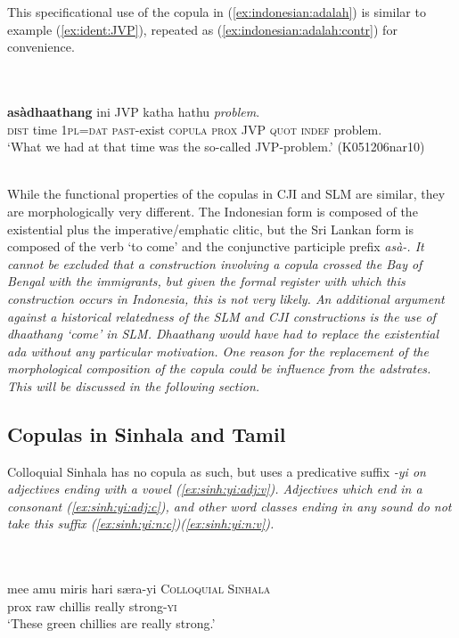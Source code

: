 \documentclass[a4paper,12pt]{article}
\newcommand{\xbox}[2]{\noindent\parbox[t]{#1}{#2}\noindent}
\newcommand{\xref}[1]{(\ref{#1})}
\newcommand{\trs}[2]{{\em #1\em} `#2'}
\newcommand{\ea}{\\\\}
\newcommand{\z}{\\\\}
\begin{document}
This specificational use of the copula in \xref{ex:indonesian:adalah} is similar to example \xref{ex:ident:JVP}, repeated as \xref{ex:indonesian:adalah:contr} for convenience.


\xbox{\textwidth}{
\ea \label{ex:indonesian:adalah:contr}
\gll [Itthu    vakthu kithang=nang nya-aada]     \textbf{asàdhaathang} ini      JVP katha hathu  {\em problem}. \\
     \textsc{dist} time \textsc{1pl}=\textsc{dat} \textsc{past}-exist \textsc{copula} \textsc{prox} JVP \textsc{quot} \textsc{indef} problem. \\
    `What we had at that time was the so-called JVP-problem.' (K051206nar10)
\z
}


While the functional properties of the copulas in CJI and SLM are similar, they are morphologically very different. The Indonesian form is composed of the existential plus the imperative/emphatic clitic, but the Sri Lankan form is composed of the verb `to come' and the conjunctive participle prefix \em asà-\em. It cannot be excluded that a construction involving a copula crossed the Bay of Bengal with the immigrants, but given the formal register with which this construction occurs in Indonesia, this is not very likely. An additional argument against a historical relatedness of the SLM and CJI constructions is the use of \trs{dhaathang}{come} in SLM. \em Dhaathang \em   would have had to replace the existential \em ada \em without any particular motivation. One reason for the replacement of the morphological composition of the copula could be influence from the adstrates. This will be discussed in the following section.

\subsection{Copulas in Sinhala and Tamil}
Colloquial Sinhala has no copula as such, but uses a predicative suffix \em -yi \em on adjectives ending with a vowel \xref{ex:sinh:yi:adj:v}. Adjectives which end in a consonant  \xref{ex:sinh:yi:adj:c}, and other word classes ending in any sound do not take this suffix \xref{ex:sinh:yi:n:c}\xref{ex:sinh:yi:n:v}.


\xbox{\textwidth}{
\ea\label{ex:sinh:yi:adj:v}
\gll mee amu miris hari s\ae ra-yi \textsc{Colloquial Sinhala}  \\
     prox raw chillis really strong-\textsc{yi}  \\
    `These green chillies are really strong.' \citep[794]{Gair2003}
\z
} 
\end{document}
